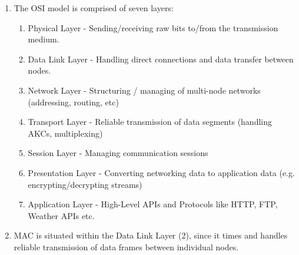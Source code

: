 
    \begin{enumerate}
        \item The OSI model is comprised of seven layers: \begin{enumerate}[label=Layer \arabic*:,leftmargin=*]
            \item Physical Layer - Sending/receiving raw bits to/from the transmission medium.
            \item Data Link Layer - Handling direct connections and data transfer between nodes.
            \item Network Layer - Structuring / managing of multi-node networks (addressing, routing, etc)
            \item Transport Layer - Reliable transmission of data segments (handling AKCs, multiplexing)
            \item Session Layer - Managing communication sessions
            \item Presentation Layer - Converting networking data to application data (e.g. encrypting/decrypting streams)
            \item Application Layer - High-Level APIs and Protocols like HTTP, FTP, Weather APIs etc.
        \end{enumerate}

        \item MAC is situated within the Data Link Layer (2), since it times and handles reliable transmission of data frames between individual nodes.
    \end{enumerate}


